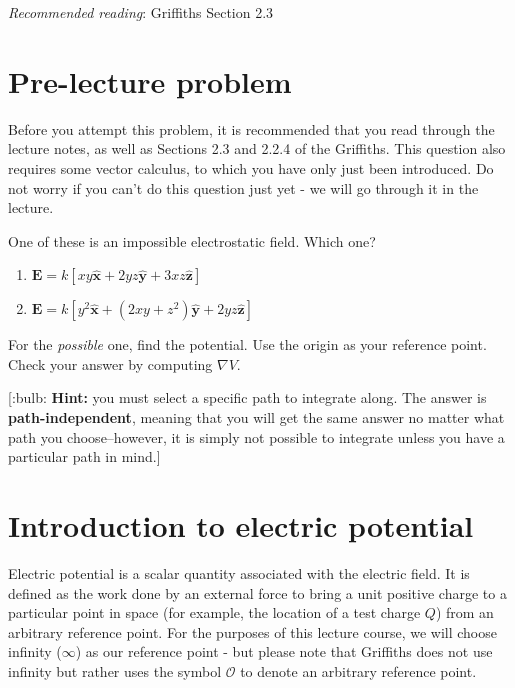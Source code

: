 \documentclass[
  letterpaper,
  DIV=11,
  numbers=noendperiod]{scrreprt}
\begin{document}
\newcommand{\a}{\mathrm{\mathbf{a}}}
\newcommand{\b}{\mathrm{\mathbf{b}}}

\emph{Recommended reading}: Griffiths Section 2.3

\section{Pre-lecture problem}\label{pre-lecture-problem-1}

Before you attempt this problem, it is recommended that you read through
the lecture notes, as well as Sections 2.3 and 2.2.4 of the Griffiths.
This question also requires some vector calculus, to which you have only
just been introduced. Do not worry if you can't do this question just
yet - we will go through it in the lecture.

One of these is an impossible electrostatic field. Which one?

\begin{enumerate}
\def\labelenumi{(\alph{enumi})}
\item
  \(\mathrm{\mathbf{E}}= k[ xy \hat{\mathrm{\mathbf{x}}} + 2yz \hat{\mathrm{\mathbf{y}}} + 3xz \hat{\mathrm{\mathbf{z}}} ]\)
\item
  \(\mathrm{\mathbf{E}}= k[ y^2 \hat{\mathrm{\mathbf{x}}} + (2xy + z^2)\hat{\mathrm{\mathbf{y}}} + 2yz \hat{\mathrm{\mathbf{z}}} ]\)
\end{enumerate}

For the \emph{possible} one, find the potential. Use the origin as your
reference point. Check your answer by computing \(\nabla V\).

{[}:bulb: \textbf{Hint:} you must select a specific path to integrate
along. The answer is \textbf{path-independent}, meaning that you will
get the same answer no matter what path you choose--however, it is
simply not possible to integrate unless you have a particular path in
mind.{]}

\section{Introduction to electric
potential}\label{introduction-to-electric-potential}

Electric potential is a scalar quantity associated with the electric
field. It is defined as the work done by an external force to bring a
unit positive charge to a particular point in space (for example, the
location of a test charge \(Q\)) from an arbitrary reference point. For
the purposes of this lecture course, we will choose infinity
(\(\infty\)) as our reference point - but please note that Griffiths
does not use infinity but rather uses the symbol \(\mathcal{O}\) to
denote an arbitrary reference point.
\end{document}
